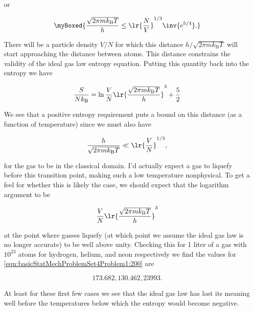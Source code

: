 {or

\begin{equation}\label{eqn:basicStatMechProblemSet4Problem1:140}
\myBoxed{
\frac{\sqrt{2 \pi m k_{\mathrm{B}} T}}{h} \le \lr{\frac{N}{V}}^{1/3} \inv{e^{5/4}}.
}
\end{equation}

There will be a particle density $V/N$ for which this distance $h/\sqrt{2 \pi m k_{\mathrm{B}} T}$ will start approaching the distance between atoms.  This distance constrains the validity of the ideal gas law entropy equation.  Putting this quantity back into the entropy  we have

\begin{equation}\label{eqn:basicStatMechProblemSet4Problem1:160}
\frac{S}{N k_{\mathrm{B}}} = \ln \frac{V}{N} \lr{\frac{\sqrt{2 \pi m k_{\mathrm{B}} T}}{h}}^3 + \frac{5}{2}
\end{equation}

We see that a positive entropy requirement puts a bound on this distance (as a function of temperature) since we must also have

\begin{equation}\label{eqn:basicStatMechProblemSet4Problem1:180}
\frac{h}{\sqrt{2 \pi m k_{\mathrm{B}} T}} \ll \lr{\frac{V}{N}}^{1/3},
\end{equation}

for the gas to be in the classical domain.  I'd actually expect a gas to liquefy before this transition point, making such a low temperature nonphysical.  To get a feel for whether this is likely the case, we should expect that the logarithm argument to be

\begin{equation}\label{eqn:basicStatMechProblemSet4Problem1:200}
\frac{V}{N} \lr{\frac{\sqrt{2 \pi m k_{\mathrm{B}} T}}{h}}^3
\end{equation}

at the point where gasses liquefy (at which point we assume the ideal gas law is no longer accurate) to be well above unity.  Checking this for 1 liter of a gas with $10^23$ atoms for hydrogen, helium, and neon respectively we find the values for \ref{eqn:basicStatMechProblemSet4Problem1:200} are

\begin{equation}\label{eqn:basicStatMechProblemSet4Problem1:220}
173.682, 130.462, 23993.
\end{equation}

At least for these first few cases we see that the ideal gas law has lost its meaning well before the temperatures below which the entropy would become negative.  
}
